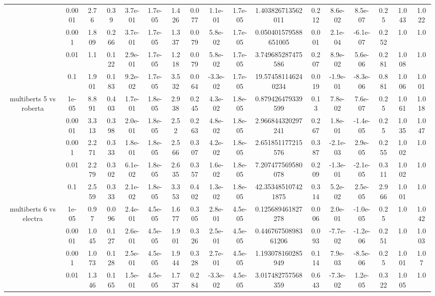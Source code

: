 \begin{tabular}{|c|c|c|c|c|c|c|c|c|c|c|c|c|c|c|c|c|}
 & 0.0001 & 2.76 & 0.39 & 3.7e-01 & 1.7e-05 & 1.426 & 0.077 & 1.1e-01 & 1.7e-05 & 1.403826713562011 & 0.212 & 8.6e-02 & 8.5e-07 & 0.25 & 1.043 & 1.022 \\
 & 0.001 & 1.809 & 0.266 & 3.7e-01 & 1.7e-05 & 1.337 & 0.079 & 5.8e-02 & 1.7e-05 & 0.050401579588651005 & 0.001 & 2.1e-04 & -6.1e-07 & 0.252 & 1.0 & 1.0 \\
 & 0.01 & 1.1 & 0.122 & 2.9e-01 & 1.7e-05 & 1.218 & 0.079 & 5.8e-02 & 1.7e-05 & 3.749685287475586 & 0.207 & 8.9e-02 & 5.6e-06 & 0.281 & 1.008 & 1.0 \\
 & 0.1 & 1.901 & 0.183 & 9.2e-02 & 1.7e-05 & 3.532 & 0.064 & -3.3e-02 & 1.7e-05 & 19.574581146240234 & 0.019 & -1.9e-01 & -8.3e-06 & 0.881 & 1.006 & 1.001 \\
\hline
\multirow{5}{*}{multiberts 5 vs roberta } & 1e-05 & 8.891 & 0.403 & 1.7e-01 & 1.8e-05 & 2.938 & 0.245 & 4.3e-02 & 1.8e-05 & 0.879426479339599 & 0.13 & 7.8e-02 & 7.6e-07 & 0.25 & 1.061 & 1.018 \\
 & 0.0001 & 3.313 & 0.398 & 2.0e-01 & 1.8e-05 & 2.52 & 0.263 & 4.8e-02 & 1.8e-05 & 2.966844320297241 & 0.267 & 1.8e-01 & -1.4e-05 & 0.25 & 1.035 & 1.047 \\
 & 0.001 & 2.271 & 0.333 & 1.8e-01 & 1.8e-05 & 2.566 & 0.307 & 4.2e-02 & 1.8e-05 & 2.651851177215576 & 0.387 & -2.1e-03 & 2.9e-05 & 0.255 & 1.002 & 1.0 \\
 & 0.01 & 2.279 & 0.302 & 6.1e-02 & 1.8e-05 & 2.635 & 0.357 & 1.6e-02 & 1.8e-05 & 7.207477569580078 & 0.209 & -1.3e-01 & -2.1e-05 & 0.311 & 1.002 & 1.0 \\
 & 0.1 & 2.559 & 0.333 & 2.1e-02 & 1.8e-05 & 3.353 & 0.402 & 1.3e-02 & 1.8e-05 & 42.353485107421875 & 0.314 & 5.2e-02 & 2.5e-05 & 2.966 & 1.001 & 1.0 \\
\hline
\multirow{5}{*}{multiberts 6 vs electra } & 1e-05 & 0.97 & 0.096 & 2.4e-01 & 4.5e-05 & 1.677 & 0.305 & 2.8e-01 & 4.5e-05 & 0.125689461827278 & 0.006 & 2.0e-01 & -1.0e-05 & 0.25 & 1.0 & 1.042 \\
 & 0.0001 & 1.045 & 0.127 & 2.6e-01 & 4.5e-05 & 1.901 & 0.326 & 2.5e-01 & 4.5e-05 & 0.44676750898361206 & 0.093 & -7.7e-02 & -1.2e-06 & 0.251 & 1.0 & 1.003 \\
 & 0.001 & 1.073 & 0.128 & 2.5e-01 & 4.5e-05 & 1.944 & 0.328 & 2.7e-01 & 4.5e-05 & 1.193078160285949 & 0.114 & 7.9e-03 & -8.5e-06 & 0.25 & 1.001 & 1.07 \\
 & 0.01 & 1.346 & 0.165 & 1.5e-01 & 4.5e-05 & 1.737 & 0.284 & -3.3e-02 & 4.5e-05 & 3.017482757568359 & 0.643 & -7.3e-02 & 1.2e-05 & 0.322 & 1.005 & 1.0 \\

\end{tabular}
